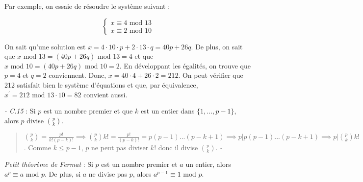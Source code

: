 Par exemple, on essaie de résoudre le système suivant : 

\begin{equation*}
    \begin{cases}
        x \equiv 4 \text{ mod } 13 \\
        x \equiv 2 \text{ mod } 10
    \end{cases}
\end{equation*}

On sait qu'une solution est $x = 4 \cdot 10 \cdot p + 2 \cdot 13 \cdot q = 40p + 26 q$. De plus, on sait que $x \text{ mod } 13 = (40p + 26q) \text{ mod } 13 = 4$ et que $x \text{ mod } 10 = (40p + 26q) \text{ mod } 10 = 2$. En développant les égalités, on trouve que $p=4$ et $q=2$ conviennent. Donc, $x = 40 \cdot 4 + 26 \cdot 2 = 212$. On peut vérifier que 212 satisfait bien le système d'équations et que, par équivalence, $x^{'} = 212 \text{ mod } 13 \cdot 10 = 82$ convient aussi.


\textit{- C.15} : Si $p$ est un nombre premier et que $k$ est un entier dans $\{1, ..., p-1\}$, alors $p$ divise $\binom{p}{k}$.

\begin{quote}
    $\binom{p}{k} = \frac{p!}{k!(p-k)!} \implies \binom{p}{k}k! = \frac{p!}{(p-k)!} = p(p-1)...(p-k+1) \implies p|p(p-1)...(p-k+1) \implies p|\binom{p}{k}k!$. Comme $k\leq p-1$, $p$ ne peut pas diviser $k!$ donc il divise $\binom{p}{k}$. $\square$
\end{quote}

\textit{Petit théorème de Fermat} : Si $p$ est un nombre premier et $a$ un entier, alors $a^p \equiv a \text{ mod } p$. De plus, si $a$ ne divise pas $p$, alors $a^{p-1} \equiv 1 \text{ mod } p$.

